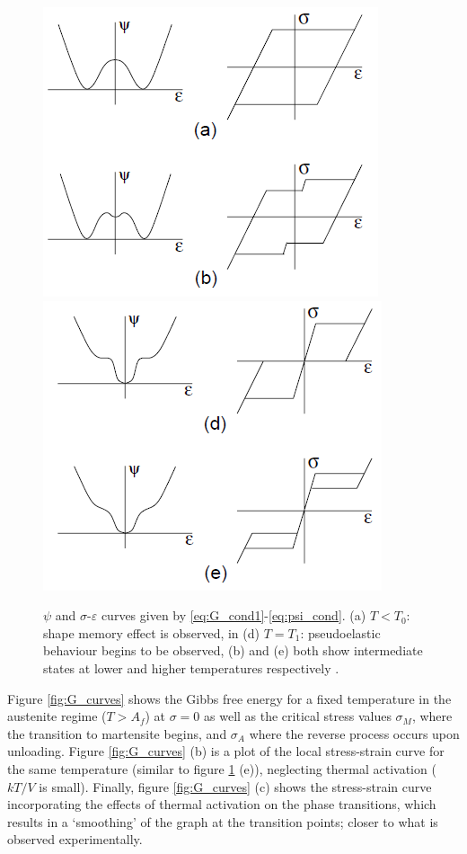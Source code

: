 \begin{multicols}{2}
\begin{figure}[H]
    \centering
    \includegraphics[scale=0.50]{._figures/psi_curves (2).png}
    \includegraphics[scale=0.55]{._figures/psi_curves (3).png}
    \caption[Energy density and stress-strain curves]{$\psi$ and $\sigma$-$\varepsilon$ curves given by \ref{eq:G_cond1}-\ref{eq:psi_cond}. (a) $T < T_0$: shape memory effect is observed, in (d) $T = T_1$\footnotemark: pseudoelastic behaviour begins to be observed, (b) and (e) both show intermediate states at lower and higher temperatures respectively \cite{smith2005smart}.}
    \label{fig:Psi_curves}
\end{figure}


Figure \ref{fig:G_curves} shows the Gibbs free energy for a fixed temperature in the austenite regime ($T > A_f$) at $\sigma = 0$ as well as the critical stress values $\sigma_M$, where the transition to martensite begins, and $\sigma_A$ where the reverse process occurs upon unloading. Figure \ref{fig:G_curves} (b) is a plot of the local stress-strain curve for the same temperature (similar to figure \ref{fig:Psi_curves} (e)), neglecting thermal activation ($kT/V$ is small). Finally,  figure \ref{fig:G_curves} (c) shows the stress-strain curve incorporating the effects of thermal activation on the phase transitions, which results in a `smoothing' of the graph at the transition points; closer to what is observed experimentally.


\end{multicols}
